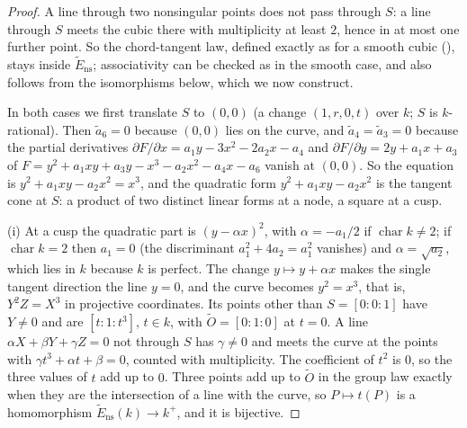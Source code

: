 \begin{proof}
A line through two nonsingular points does not pass through $S$: a line through $S$ meets the cubic there with
multiplicity at least $2$, hence in at most one further point. So the chord-tangent law, defined exactly as for
a smooth cubic (), stays inside $\tilde E_{\mathrm{ns}}$; associativity can be checked as in the
smooth case, and also follows from the isomorphisms below, which we now construct.

In both cases we first translate $S$ to $(0,0)$ (a change $(1,r,0,t)$ over $k$; $S$ is $k$-rational). Then $\tilde a_6=0$
because $(0,0)$ lies on the curve, and $\tilde a_4=\tilde a_3=0$ because the partial derivatives
$\partial F/\partial x=a_1y-3x^2-2a_2x-a_4$ and $\partial F/\partial y=2y+a_1x+a_3$ of
$F=y^2+a_1xy+a_3y-x^3-a_2x^2-a_4x-a_6$ vanish at $(0,0)$. So the equation is $y^2+a_1xy-a_2x^2=x^3$, and the quadratic
form $y^2+a_1xy-a_2x^2$ is the tangent cone at $S$: a product of two distinct linear forms at a node, a square at a cusp.

(i) At a cusp the quadratic part is $(y-\alpha x)^2$, with $\alpha=-a_1/2$ if $\operatorname{char}k\ne2$; if $\operatorname{char}k=2$
then $a_1=0$ (the discriminant $a_1^2+4a_2=a_1^2$ vanishes) and $\alpha=\sqrt{a_2}$, which lies in $k$ because $k$ is perfect.
The change $y\mapsto y+\alpha x$ makes the single tangent direction the line $y=0$, and the curve becomes $y^2=x^3$, that
is, $Y^2Z=X^3$ in projective coordinates. Its points other than
$S=[0:0:1]$ have $Y\ne0$ and are $[t:1:t^3]$, $t\in k$, with $\tilde O=[0:1:0]$ at $t=0$. A line
$\alpha X+\beta Y+\gamma Z=0$ not through $S$ has $\gamma\ne0$ and meets the curve at the points with
$\gamma t^3+\alpha t+\beta=0$, counted with multiplicity. The coefficient of $t^2$ is $0$, so the three values
of $t$ add up to $0$. Three points add up to $\tilde O$ in the group law exactly when they are the intersection
of a line with the curve, so $P\mapsto t(P)$ is a homomorphism $\tilde E_{\mathrm{ns}}(k)\to k^+$, and it is
bijective.


\end{proof}
